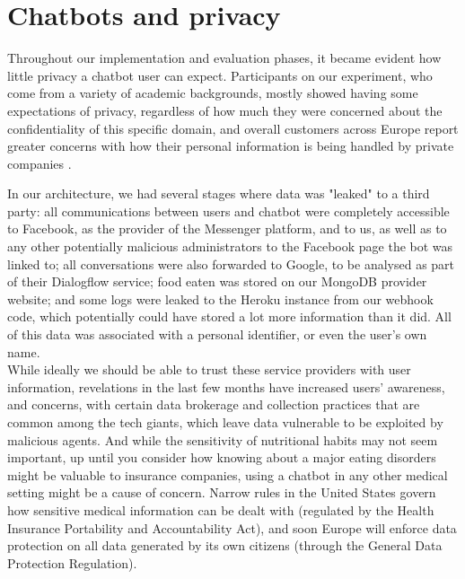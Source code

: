 \section{Chatbots and privacy}
Throughout our implementation and evaluation phases, it became evident how little privacy a chatbot user can expect. Participants on our experiment, who come from a variety of academic backgrounds, mostly showed having some expectations of privacy, regardless of how much they were concerned about the confidentiality of this specific domain, and overall customers across Europe report greater concerns with how their personal information is being handled by private companies \cite{europasurvey}. 

In our architecture, we had several stages where data was "leaked" to a third party: all communications between users and chatbot were completely accessible to Facebook, as the provider of the Messenger platform, and to us, as well as to any other potentially malicious administrators to the Facebook page the bot was linked to; all conversations were also forwarded to Google, to be analysed as part of their Dialogflow service; food eaten was stored on our MongoDB provider website; and some logs were leaked to the Heroku instance from our webhook code, which potentially could have stored a lot more information than it did. All of this data was associated with a personal identifier, or even the user's own name. \\
While ideally we should be able to trust these service providers with user information, revelations in the last few months have increased users' awareness, and concerns, with certain data brokerage and collection practices that are common among the tech giants, which leave data vulnerable to be exploited by malicious agents. And while the sensitivity of nutritional habits may not seem important, up until you consider how knowing about a major eating disorders might be valuable to insurance companies, using a chatbot in any other medical setting might be a cause of concern. Narrow rules in the United States govern how sensitive medical information can be dealt with (regulated by the Health Insurance Portability and Accountability Act), and soon Europe will enforce data protection on all data generated by its own citizens (through the General Data Protection Regulation).

